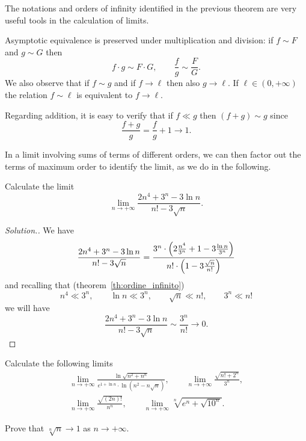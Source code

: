 The notations and
orders of infinity identified in the previous theorem
are very useful tools in the calculation of limits.

Asymptotic equivalence
is preserved under multiplication and division:
if $f\sim F$ and $g\sim G$ then
\[
 f \cdot g \sim F \cdot G,
 \qquad
 \frac{f}{g} \sim \frac{F}{G}.
\]
We also observe that if
$f \sim g$ and if $f\to \ell$ then
also $g\to \ell$.
If $\ell\in(0,+\infty)$
the relation $f\sim \ell$ is equivalent to $f\to \ell$.

Regarding addition,
it is easy to verify that if $f\ll g$ then
$(f+g) \sim g$ since
\[
  \frac{f + g}{g} = \frac{f}{g} + 1 \to 1.
\]

In a limit involving sums of terms
of different orders, we can then factor out the terms of maximum order to
identify the limit, as we do in the following.

\begin{example}
Calculate the limit
\[
\lim_{n\to+\infty}
\frac{2n^4 + 3^n - 3 \ln n}{n! - 3\sqrt n}.
\]
\end{example}
\begin{proof}[Solution.]
We have
\[
\frac{2n^4 + 3^n - 3 \ln n}{n! - 3\sqrt{n}}
= \frac
{3^n \cdot {\left( 2\frac{n^4}{3^n}+ 1 - 3\frac{\ln n}{3^n} \right)}}
{n!\cdot {\left( 1-3\frac{\sqrt n}{n!} \right)}}
\]
and recalling that (theorem~\ref{th:ordine_infinito})
\[
n^4 \ll 3^n, \qquad
\ln n \ll 3^n, \qquad
\sqrt n \ll n!, \qquad
3^n \ll n!
\]
we will have
\[
\frac{2n^4 + 3^n - 3 \ln n}{n! - 3\sqrt{n}}
\sim \frac{3^n}{n!} \to 0.
\]
\end{proof}


\begin{exercise}
Calculate the following limits
\begin{gather*}
  \lim_{n\to +\infty} \frac{\displaystyle \ln\sqrt{n^2+n^n}}
  {\displaystyle e^{1 + \ln n}\cdot \ln(n^2-n\sqrt n)}, \qquad
  \lim_{n\to +\infty} \frac{\sqrt{n! + 2^n}}{3^n}, \\
  \lim_{n\to +\infty} \frac{\sqrt{(2n)!}}{n^n}, \qquad
  \lim_{n\to +\infty} \sqrt[n]{e^n + \sqrt{10^n}}.
\end{gather*}
\end{exercise}

\begin{exercise}
  Prove that $\sqrt[n]{n}\to 1$ as $n\to +\infty$.
\end{exercise}



